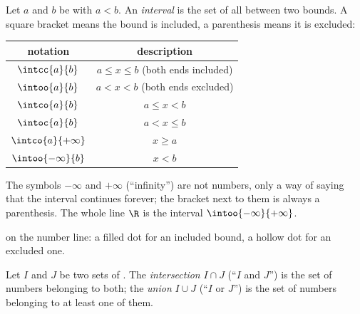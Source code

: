 \begin{definition}[Interval]\label{def:g10:numbers:interval}
Let $a$ and $b$ be  with $a < b$. An
\emph{interval} is the set of all  between two
bounds. A square bracket means the bound is included, a parenthesis means
it is excluded:
\begin{center}
\begin{tabular}{c|c}
notation & description \\
\hline
$\intcc{a}{b}$ & $a \leq x \leq b$ (both ends included) \\
$\intoo{a}{b}$ & $a < x < b$ (both ends excluded) \\
$\intco{a}{b}$ & $a \leq x < b$ \\
$\intoc{a}{b}$ & $a < x \leq b$ \\
$\intco{a}{+\infty}$ & $x \geq a$ \\
$\intoo{-\infty}{b}$ & $x < b$ \\
\end{tabular}
\end{center}
The symbols $-\infty$ and $+\infty$ (``infinity'') are not numbers, only a
way of saying that the interval continues forever; the bracket next to
them is always a parenthesis. The whole line $\R$ is the interval
$\intoo{-\infty}{+\infty}$.
\end{definition}

\begin{omfigure}

{\small {} on the number line: a filled dot for an included bound,
a hollow dot for an excluded one.}
\end{omfigure}

\begin{definition}\label{def:g10:numbers:interunion}
Let $I$ and $J$ be two sets of .
The \emph{intersection} $I \cap J$ (``$I$ and $J$'')
is the set of numbers belonging to both; the
\emph{union} $I \cup J$ (``$I$ or $J$'') is the set of
numbers belonging to at least one of them.
\end{definition}

